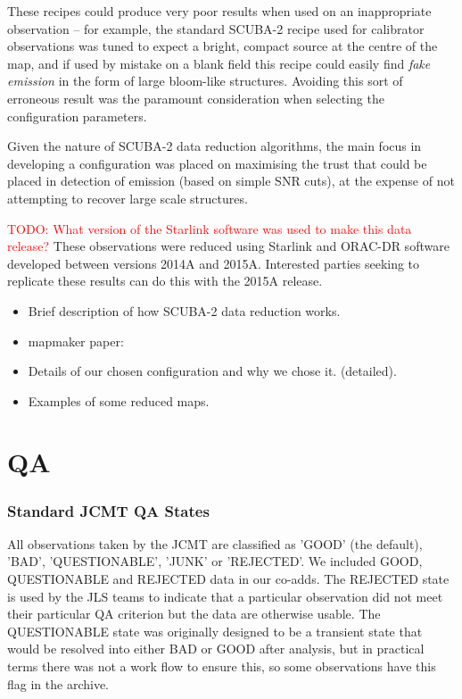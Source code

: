 \documentclass[usenatbib]{mn2e}
\newcommand{\todo}[1]{\textcolor{red}{TODO: #1}}
\begin{document}
These recipes could produce very poor results when used on an
inappropriate observation -- for example, the standard SCUBA-2 recipe
used for calibrator observations was tuned to expect a bright, compact
source at the centre of the map, and if used by mistake on a blank
field this recipe could easily find \emph{fake emission} in the form
of large bloom-like structures. Avoiding this sort of erroneous result
was the paramount consideration when selecting the configuration
parameters.

Given the nature of SCUBA-2 data reduction algorithms, the main focus
in developing a configuration was placed on maximising the trust that
could be placed in detection of emission (based on simple SNR cuts),
at the expense of not attempting to recover large scale
structures.


\todo{What version of the Starlink software was used to make this data
  release?}  These observations were reduced using Starlink and
ORAC-DR software developed between versions 2014A and
2015A. Interested parties seeking to replicate these results can do
this with the 2015A release.

\begin{itemize}
\item Brief description of how SCUBA-2 data reduction works.
\item mapmaker paper: \citep{Chapin2013}
\item Details of our chosen configuration and why we chose it. (detailed).
\item Examples of some reduced maps.
\end{itemize}


\section{QA}
\label{sec:qa}
\subsubsection{Standard JCMT QA States}
All observations taken by the JCMT are classified as 'GOOD' (the
default), 'BAD', 'QUESTIONABLE', 'JUNK' or 'REJECTED'. We included
GOOD, QUESTIONABLE and REJECTED data in our co-adds. The REJECTED
state is used by the JLS teams to indicate that a particular
observation did not meet their particular QA criterion but the data
are otherwise usable. The QUESTIONABLE
state was originally designed to be a transient state that would be
resolved into either BAD or GOOD after analysis, but in practical
terms there was not a work flow to ensure this, so some observations
have this flag in the archive.
\end{document}
